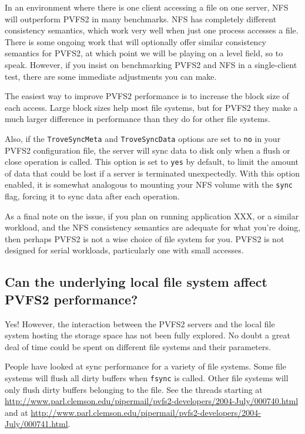 \documentclass[11pt,letterpaper]{article}
\begin{document}
In an environment where there is one client accessing a file on one
server, NFS will outperform PVFS2 in many benchmarks.  NFS has
completely different consistency semantics, which work very well when
just one process accesses a file.  There is some ongoing work that
will optionally offer similar consistency semantics for PVFS2, at
which point we will be playing on a level field, so to speak.
However, if you insist on benchmarking PVFS2 and NFS in a
single-client test, there are some immediate adjustments you can make.

The easiest way to improve PVFS2 performance is to increase the block
size of each access.  Large block sizes help most file systems, but
for PVFS2 they make a much larger difference in performance than they
do for other file systems.

Also, if the \texttt{TroveSyncMeta} and \texttt{TroveSyncData} options
are set to \texttt{no} in your PVFS2 configuration file, the server
will sync data to disk only when a flush or close operation is called.
This option is set to \texttt{yes} by default, to limit the amount of
data that could be lost if a server is terminated unexpectedly.  With
this option enabled, it is somewhat analogous to mounting your NFS
volume with the \texttt{sync} flag, forcing it to sync data after each
operation.

As a final note on the issue, if you plan on running application XXX,
or a similar workload, and the NFS consistency semantics are adequate
for what you're doing, then perhaps PVFS2 is not a wise choice of file
system for you.  PVFS2 is not designed for serial workloads,
particularly one with small accesses.

\subsection{Can the underlying local file system affect PVFS2 performance?}

Yes!  However, the interaction between the PVFS2 servers and the local
file system hosting the storage space has not been fully explored.  No
doubt a great deal of time could be spent on different file systems
and their parameters.

People have looked at sync performance for a variety of file systems.
Some file systems will flush all dirty buffers when \texttt{fsync} is
called.  Other file systems will only flush dirty buffers belonging to
the file. See the threads starting at
\url{http://www.parl.clemson.edu/pipermail/pvfs2-developers/2004-July/000740.html}
and at
\url{http://www.parl.clemson.edu/pipermail/pvfs2-developers/2004-July/000741.html}.
\end{document}
